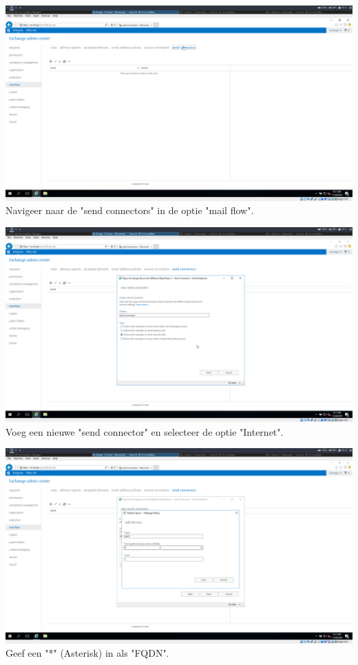 \documentclass[a4paper]{article}
\begin{document}
\begin{center}
	\includegraphics[width=15cm]{Pictures/Exchange/config/1543425094.png}
	Navigeer naar de "send connectors" in de optie "mail flow".
\end{center}
\begin{center}
	\includegraphics[width=15cm]{Pictures/Exchange/config/1543425117.png}
	Voeg een nieuwe "send connector" en selecteer de optie "Internet".
\end{center}
\begin{center}
	\includegraphics[width=15cm]{Pictures/Exchange/config/1543425143.png}
	Geef een "*" (Asterisk) in als "FQDN".
\end{center}
\end{document}
